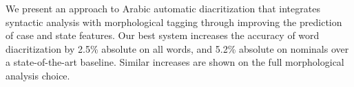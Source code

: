 We present an approach to Arabic automatic diacritization that integrates syntactic analysis with morphological tagging through improving the prediction of case and state features. Our best system increases the accuracy of word diacritization by 2.5\% absolute on all words, and 5.2\% absolute on nominals over a state-of-the-art baseline. Similar increases are shown on the full morphological analysis choice.
